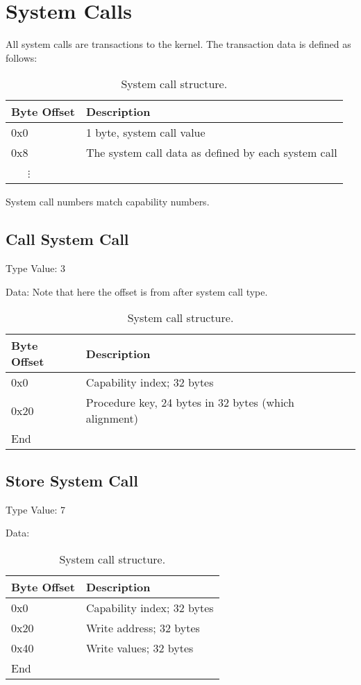\documentclass[english,a4paper]{article}
\begin{document}
\section{System Calls}
All system calls are transactions to the kernel. The transaction data is defined
as follows:

\begin{table}[H]
  \caption{System call structure.}
  \centering{}%
  \begin{tabular}{l|p{}}
    \hline
    Byte Offset & Description\tabularnewline
    \hline
    \hline
    0x0 & 1 byte, system call value \tabularnewline
    0x8 & The system call data as defined by each system call \tabularnewline
    ~~~$\vdots$ &  \tabularnewline
    \hline
  \end{tabular}
\end{table}

System call numbers match capability numbers.


\subsection{Call System Call}
Type Value: 3

Data: Note that here the offset is from after system call type.

\begin{table}[H]
  \caption{System call structure.}
  \centering{}%
  \begin{tabular}{l|p{}}
    \hline
    Byte Offset & Description\tabularnewline
    \hline
    \hline
    0x0 & Capability index; 32 bytes \tabularnewline
    0x20 & Procedure key, 24 bytes in 32 bytes (which alignment) \tabularnewline
    \hline
    End &  \tabularnewline
    \hline
  \end{tabular}
\end{table}

\subsection{Store System Call}
Type Value: 7

Data:

\begin{table}[H]
  \caption{System call structure.}
  \centering{}%
  \begin{tabular}{l|p{}}
    \hline
    Byte Offset & Description\tabularnewline
    \hline
    \hline
    0x0 & Capability index; 32 bytes \tabularnewline
    0x20 & Write address; 32 bytes \tabularnewline
    0x40 & Write values; 32 bytes \tabularnewline
    \hline
    End &  \tabularnewline
    \hline
  \end{tabular}
\end{table}
\end{document}
